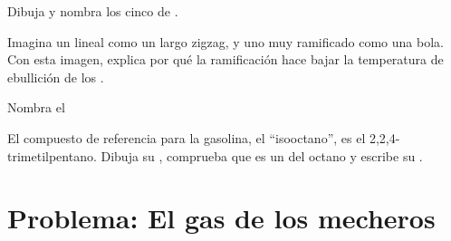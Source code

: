 \begin{exercise}[$\star\star\star$]\label{exo:g11:organic-skeletons:12}
Dibuja y nombra los cinco  de .
\end{exercise}

\begin{exercise}[$\star\star\star$]\label{exo:g11:organic-skeletons:13}
Imagina un  lineal como un largo zigzag, y uno muy ramificado como
una bola. Con esta imagen, explica por qué la ramificación hace bajar la
temperatura de ebullición de los .
\end{exercise}

\begin{exercise}[$\star\star\star$]\label{exo:g11:organic-skeletons:14}
Nombra el 
\begin{center}
\end{center}
\end{exercise}

\begin{exercise}[$\star\star\star$]\label{exo:g11:organic-skeletons:15}
El compuesto de referencia para la gasolina, el ``isooctano'', es el
2,2,4-trimetilpentano. Dibuja su , comprueba que es
un  del octano y escribe su .
\end{exercise}

\section{Problema: El gas de los mecheros}

